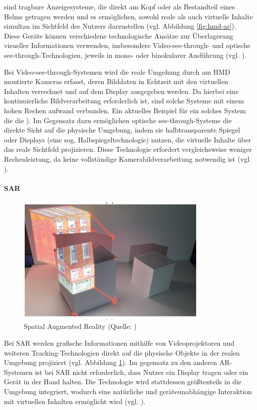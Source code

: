 sind tragbare Anzeigesysteme, die direkt am Kopf oder als Bestandteil eines Helms getragen werden und es ermöglichen, sowohl reale als auch virtuelle Inhalte simultan im Sichtfeld des Nutzers darzustellen (vgl. Abbildung \ref{fig:hmd-ar}). Diese Geräte können verschiedene technologische Ansätze zur Überlagerung visueller Informationen verwenden, insbesondere Video-see-through- und optische see-through-Technologien, jeweils in mono- oder binokularer Ausführung (vgl. \citealp[S. 346]{carmigniani_augmented_2011}).

Bei Video-see-through-Systemen wird die reale Umgehung durch am \ac{HMD} montierte Kameras erfasst, deren Bilddaten in Echtzeit mit den virtuellen Inhalten verrechnet und auf dem Display ausgegeben werden. Da hierbei eine kontinuierliche Bildverarbeitung erforderlich ist, sind solche Systeme mit einem hohen Rechen aufwand verbunden. Ein aktuelles Beispiel für ein solches System die die \cite{htc_vive_2023}). Im Gegensatz dazu ermöglichen optische see-through-Systeme die direkte Sicht auf die physische Umgebung, indem sie halbtransparente Spiegel oder Displays (eine sog. Halbspiegeltechnologie) nutzen, die virtuelle Inhalte über das reale Sichtfeld projizieren. Diese Technologie erfordert vergleichsweise weniger Rechenleistung, da keine vollständige Kamerabildverarbeitung notwendig ist (vgl. \citealp[S. 346f]{carmigniani_augmented_2011}).

\paragraph{\ac{SAR}}
\begin{figure}[ht]
\centering
\includegraphics[width=0.5\linewidth]{content/pictures/spatial-ar.PNG}
\caption{Spatial Augmented Reality (Quelle: \citealp[S. 7]{jin_bim-based_2020})}
\label{fig:spatial-ar}
\end{figure}

Bei \ac{SAR} werden grafische Informationen mithilfe von Videoprojektoren und weiteren Tracking-Technologien direkt auf die physische Objekte in der realen Umgebung projiziert (vgl. Abbildung \ref{fig:spatial-ar}). Im gegensatz zu den anderen \ac{AR}-Systemen ist bei \ac{SAR} nicht erforderlich, dass Nutzer ein Display tragen oder ein Gerät in der Hand halten. Die Technologie wird stattdessen größtenteils in die Umgebung integriert, wodurch eine natürliche und geräteunabhängige Interaktion mit virtuellen Inhalten ermöglicht wird (vgl. \citealp[S. 348]{carmigniani_augmented_2011}).

